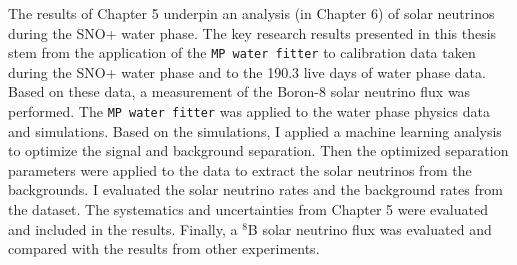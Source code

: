The results of Chapter 5 underpin an analysis (in Chapter 6) of solar neutrinos during the SNO+ water phase. The key research results presented in this thesis stem from the application of the \texttt{MP water fitter} to calibration data taken during the SNO+ water phase and to the 190.3 live days of water phase data. Based on these data, a measurement of the Boron-8 solar neutrino flux was performed. The \texttt{MP water fitter} was applied to the water phase physics data and simulations. Based on the simulations, I applied a machine learning analysis to optimize the signal and background separation. Then the optimized separation parameters were applied to the data to extract the solar neutrinos from the backgrounds. I evaluated the solar neutrino rates and the background rates from the dataset. The systematics and uncertainties from Chapter 5 were evaluated and included in the results. Finally, a $^8$B solar neutrino flux was evaluated and compared with the results from other experiments.